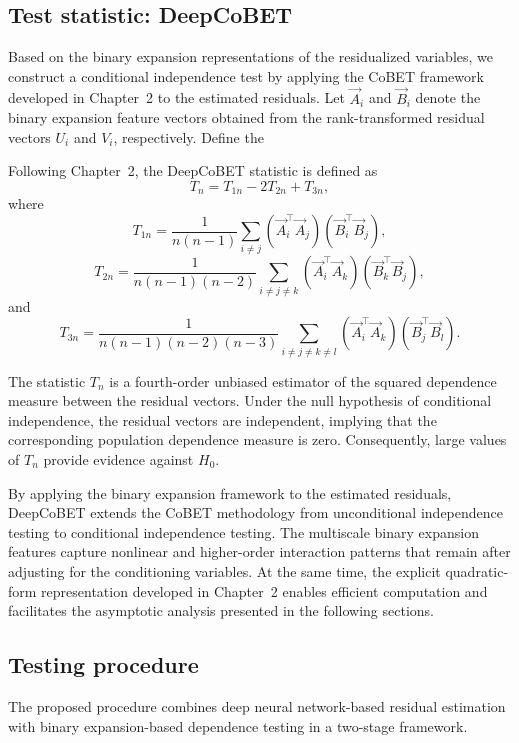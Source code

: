 \documentclass[12pt,reqno,oneside]{amsbook}
\theoremstyle{definition}
\theoremstyle{remark}
\begin{document}
\subsection{Test statistic: DeepCoBET}

Based on the binary expansion representations of the residualized variables,
we construct a conditional independence test by applying the CoBET framework
developed in Chapter~2 to the estimated residuals. Let $\vec A_i$ and
$\vec B_i$ denote the binary expansion feature vectors obtained from the
 rank-transformed residual vectors $U_i$ and $V_i$, respectively. 
Define the

Following Chapter~2, the DeepCoBET statistic is defined as 
\[
T_n
=
T_{1n}-2T_{2n}+T_{3n},
\]
where
\[
T_{1n}
=
\frac{1}{n(n-1)}
\sum_{i\neq j}
(\vec A_i^\top \vec A_j)
(\vec B_i^\top \vec B_j),
\]
\[
T_{2n}
=
\frac{1}{n(n-1)(n-2)}
\sum_{i\neq j\neq k}
(\vec A_i^\top \vec A_k)
(\vec B_k^\top \vec B_j),
\]
and
\[
T_{3n}
=
\frac{1}{n(n-1)(n-2)(n-3)}
\sum_{i\neq j\neq k\neq l}
(\vec A_i^\top \vec A_k)
(\vec B_j^\top \vec B_l).
\]

The statistic $T_n$ is a fourth-order unbiased estimator of the squared
dependence measure between the residual vectors. Under the null hypothesis of
conditional independence, the residual vectors are independent, implying that
the corresponding population dependence measure is zero. Consequently, large
values of $T_n$ provide evidence against $H_0$.

By applying the binary expansion framework to the estimated residuals,
DeepCoBET extends the CoBET methodology from unconditional independence testing
to conditional independence testing. The multiscale binary expansion features
capture nonlinear and higher-order interaction patterns that remain after
adjusting for the conditioning variables. At the same time, the explicit
quadratic-form representation developed in Chapter~2 enables efficient
computation and facilitates the asymptotic analysis presented in the following
sections.

\subsection{Testing procedure}

The proposed procedure combines deep neural network-based residual estimation
with binary expansion-based dependence testing in a two-stage framework.
\end{document}
